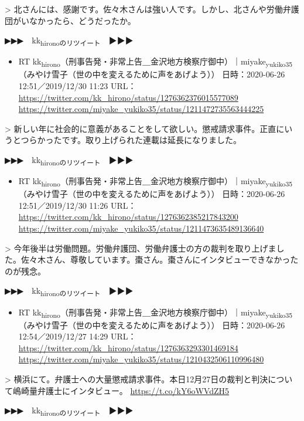 \documentclass[]{ltjarticle}
\begin{document}
> 北さんには、感謝です。佐々木さんは強い人です。しかし、北さんや労働弁護団がいなかったら、どうだったか。  

▶▶▶　kk\textsubscript{hironoのリツイート}　▶▶▶  

\begin{itemize}
\item RT kk\textsubscript{hirono}（刑事告発・非常上告＿金沢地方検察庁御中）｜miyake\textsubscript{yukiko35}（みやけ雪子（世の中を変えるために声をあげよう）） 日時：2020-06-26 12:51／2019/12/30 11:23 URL： \url{https://twitter.com/kk\_hirono/status/1276362376015577089} \url{https://twitter.com/miyake\_yukiko35/status/1211472735563444225}
\end{itemize}

> 新しい年に社会的に意義があることをして欲しい。懲戒請求事件。正直にいうとつらかったです。取り上げられた連載は延長になりました。  

▶▶▶　kk\textsubscript{hironoのリツイート}　▶▶▶  

\begin{itemize}
\item RT kk\textsubscript{hirono}（刑事告発・非常上告＿金沢地方検察庁御中）｜miyake\textsubscript{yukiko35}（みやけ雪子（世の中を変えるために声をあげよう）） 日時：2020-06-26 12:51／2019/12/30 11:26 URL： \url{https://twitter.com/kk\_hirono/status/1276362385217843200} \url{https://twitter.com/miyake\_yukiko35/status/1211473635489136640}
\end{itemize}

> 今年後半は労働問題。労働弁護団、労働弁護士の方の裁判を取り上げました。佐々木さん、尊敬しています。棗さん。棗さんにインタビューできなかったのが残念。  

▶▶▶　kk\textsubscript{hironoのリツイート}　▶▶▶  

\begin{itemize}
\item RT kk\textsubscript{hirono}（刑事告発・非常上告＿金沢地方検察庁御中）｜miyake\textsubscript{yukiko35}（みやけ雪子（世の中を変えるために声をあげよう）） 日時：2020-06-26 12:54／2019/12/27 14:29 URL： \url{https://twitter.com/kk\_hirono/status/1276363293301469184} \url{https://twitter.com/miyake\_yukiko35/status/1210432506110996480}
\end{itemize}

> 横浜にて。弁護士への大量懲戒請求事件。本日12月27日の裁判と判決について嶋崎量弁護士にインタビュー。 \url{https://t.co/kY6oWVdZH5}  

▶▶▶　kk\textsubscript{hironoのリツイート}　▶▶▶  
\end{document}
